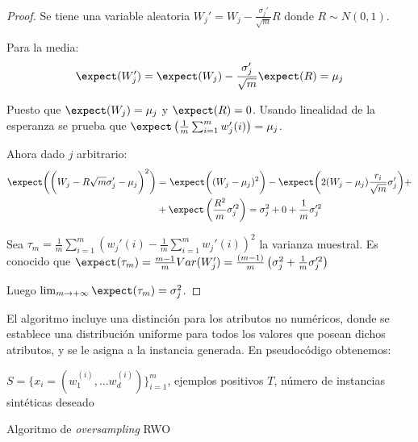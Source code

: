   \begin{proof}
   Se tiene una variable aleatoria $W_j' = W_j - \frac{\sigma_j'}{\sqrt{m}} R$ donde $R\sim N(0,1)$.
  
   Para la media:
   \[
     \expect(W_j') = \expect(W_j) - \frac{\sigma_j'}{\sqrt{m}} \expect(R) = \mu_j
   \]
   
   Puesto que $\expect(W_j) = \mu_j$ y $\expect(R) = 0$. Usando linealidad de la esperanza se prueba que
   $\expect\left(\frac{1}{m} \sum_{i=1}^m w_j'(i)\right) = \mu_j$.
   
   Ahora dado $j$ arbitrario:
   \begin{align*}
     \expect \bigg(\bigg(W_j - R{\sqrt{m}} \sigma_j' - \mu_j\bigg)^2\bigg) &= 
     \expect \bigg((W_j - \mu_j)^2 \bigg) - \expect\bigg( 2 (W_j-\mu_j) \frac{r_i}{\sqrt{m}} \sigma_j' \bigg) + \\
     &+ \expect\left(\frac{R^2}{m} \sigma_j'^2 \right) = \sigma_j^2 + 0 + \frac{1}{m}\sigma_j'^2
   \end{align*}
   
   Sea $\tau_m = \frac{1}{m} \sum_{i=1}^m \left(w_j'(i) - \frac{1}{m} \sum_{i=1}^m w_j'(i)\right)^2$ la varianza muestral.
   Es conocido que $\expect(\tau_m) = \frac{m-1}{m} Var(W_j') = 
   \frac{(m-1)}{m} \left(\sigma_j^2 + \frac{1}{m} \sigma_j'^2\right)$

   Luego $\lim_{m\rightarrow + \infty} \expect(\tau_m) = \sigma_j^2$.
  \end{proof}

El algoritmo incluye una distinción para los atributos no numéricos, donde se establece una distribución uniforme
para todos los valores que posean dichos atributos, y se le asigna a la instancia generada. En pseudocódigo
obtenemos:

\begin{algorithm}[H]
\begin{algorithmic}[1]
  \REQUIRE $S = \{x_i=(w_1^{(i)}, \ldots w_d^{(i)})\}_{i=1}^m$, ejemplos positivos
  \REQUIRE $T$, número de instancias sintéticas deseado
  \NEWLINE
    \ENDIF
  \ENDFOR
  \NEWLINE
	 \ELSE
	 \ENDIF
      \ENDFOR
    \ENDFOR
  \ENDFOR
  \NEWLINE
\end{algorithmic}
\caption{Algoritmo de \textit{oversampling} RWO}
\label{alg:rwo}
\end{algorithm}

